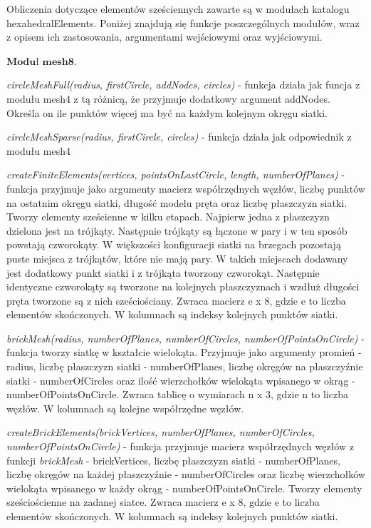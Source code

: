 Obliczenia dotyczące elementów sześciennych zawarte są w modułach katalogu hexahedralElements. Poniżej znajdują się funkcje poszczególnych modułów, wraz z opisem ich zastosowania, argumentami wejściowymi oraz wyjściowymi.

 \( \textbf{Moduł mesh8} \).

\textit{circleMeshFull(radius, firstCircle, addNodes, circles)} - funkcja działa jak funcja z modułu mesh4 z tą różnicą, że przyjmuje dodatkowy argument addNodes. Określa on ile punktów więcej ma być na każdym kolejnym okręgu siatki.

\textit{circleMeshSparse(radius, firstCircle, circles)} - funkcja działa jak odpowiednik z modułu mesh4

\textit{createFiniteElements(vertices, pointsOnLastCircle, length, numberOfPlanes)} - funkcja przyjmuje jako argumenty macierz współrzędnych węzłów, liczbę punktów na ostatnim okręgu siatki, długość modelu pręta oraz liczbę płaszczyzn siatki. Tworzy elementy sześcienne w kilku etapach. Najpierw jedna z płaszczyzn dzielona jest na trójkąty. Następnie trójkąty są łączone w pary i w ten sposób powstają czworokąty. W większości konfiguracji siatki na brzegach pozostają puste miejsca z trójkątów, które nie mają pary. W takich miejscach dodawany jest dodatkowy punkt siatki i z trójkąta tworzony czworokąt. Następnie identyczne czworokąty są tworzone na kolejnych płaszczyznach i wzdłuż długości pręta tworzone są z nich sześciościany. Zwraca macierz e x 8, gdzie e to liczba elementów skończonych. W kolumnach są indeksy kolejnych punktów siatki.

\textit{brickMesh(radius, numberOfPlanes, numberOfCircles, numberOfPointsOnCircle)} - funkcja tworzy siatkę w kształcie wielokąta. Przyjmuje jako argumenty promień - radius, liczbę płaszczyzn siatki - numberOfPlanes, liczbę okręgów na płaszczyźnie siatki - numberOfCircles oraz ilość wierzchołków wielokąta wpisanego w okrąg - numberOfPointsOnCircle. Zwraca tablicę o wymiarach n x 3, gdzie n to liczba węzłów. W kolumnach są kolejne współrzędne węzłów.

\textit{createBrickElements(brickVertices, numberOfPlanes, numberOfCircles, numberOfPointsOnCircle)} - funkcja przyjmuje macierz współrzędnych węzłów z funkcji \textit{brickMesh} - brickVertices, liczbę płaszczyzn siatki - numberOfPlanes, liczbę okręgów na każdej płaszczyźnie - numberOfCircles oraz liczbę wierzchołków wielokąta wpisanego w każdy okrąg - numberOfPointsOnCircle. Tworzy elementy sześciościenne na zadanej siatce. Zwraca macierz e x 8, gdzie e to liczba elementów skończonych. W kolumnach są indeksy kolejnych punktów siatki.

